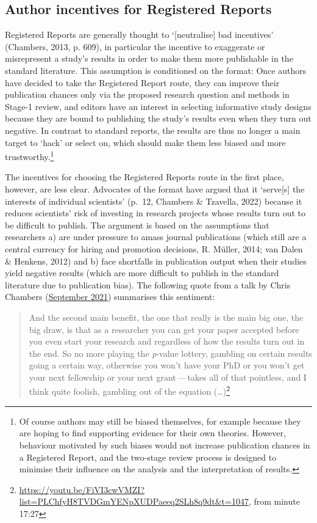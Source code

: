 \documentclass[
  ,man,mask,floatsintext]{apa6}
\begin{document}
\hypertarget{author-incentives-for-registered-reports}{%
\subsection{Author incentives for Registered Reports}\label{author-incentives-for-registered-reports}}

Registered Reports are generally thought to `{[}neutralise{]} bad incentives' (Chambers, 2013, p. 609), in particular the incentive to exaggerate or misrepresent a study's results in order to make them more publishable in the standard literature.
This assumption is conditioned on the format:
Once authors have decided to take the Registered Report route, they can improve their publication chances only via the proposed research question and methods in Stage-1 review, and editors have an interest in selecting informative study designs because they are bound to publishing the study's results even when they turn out negative.
In contrast to standard reports, the results are thus no longer a main target to `hack' or select on, which should make them less biased and more trustworthy.\footnote{Of course authors may still be biased themselves, for example because they are hoping to find supporting evidence for their own theories. However, behaviour motivated by such biases would not increase publication chances in a Registered Report, and the two-stage review process is designed to minimise their influence on the analysis and the interpretation of results.}

The incentives for choosing the Registered Reports route in the first place, however, are less clear.
Advocates of the format have argued that it `serve{[}s{]} the interests of individual scientists' (p.~12, Chambers \& Tzavella, 2022) because it reduces scientists' risk of investing in research projects whose results turn out to be difficult to publish.
The argument is based on the assumptions that researchers a) are under pressure to amass journal publications (which still are a central currency for hiring and promotion decisions, R. Müller, 2014; van Dalen \& Henkens, 2012) and b) face shortfalls in publication output when their studies yield negative results (which are more difficult to publish in the standard literature due to publication bias).
The following quote from a talk by Chris Chambers (\href{https://youtu.be/FiVI3cwVMZI?list=PLChfyH8TVDGmYENpXUDPaeeq2SLh8q9dt\&t=1047}{September 2021}) summarises this sentiment:

\begin{quote}
And the second main benefit, the one that really is the main big one, the big draw, is that as a researcher you can get your paper accepted before you even start your research and regardless of how the results turn out in the end. So no more playing the \emph{p}-value lottery, gambling on certain results going a certain way, otherwise you won't have your PhD or you won't get your next fellowship or your next grant\(\,\)---\(\,\)takes all of that pointless, and I think quite foolish, gambling out of the equation (\ldots)\footnote{\url{https://youtu.be/FiVI3cwVMZI?list=PLChfyH8TVDGmYENpXUDPaeeq2SLh8q9dt\&t=1047}, from minute 17:27}
\end{quote}
\end{document}
